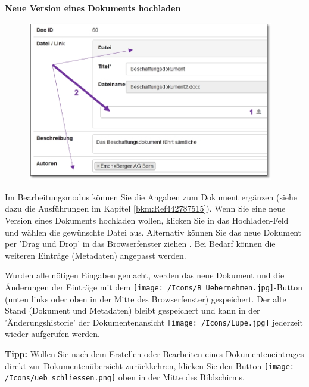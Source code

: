 \pagebreak

\textbf{Neue Version eines Dokuments hochladen}

\vspace{\baselineskip}

\begin{figure}
\vspace{-10pt}
\includegraphics[height=70mm]{../chapters/11_Dokumentenablage/pictures/11-2-5_NeuesDokuHochladen.jpg}
\end{figure}
Im Bearbeitungsmodus können Sie die Angaben zum Dokument ergänzen (siehe dazu die Ausführungen im Kapitel \ref{bkm:Ref442787515}). Wenn Sie eine neue Version eines Dokuments hochladen wollen, klicken Sie in das Hochladen-Feld  und wählen die gewünschte Datei aus. Alternativ können Sie das neue Dokument per 'Drag und Drop' in das Browserfenster ziehen . Bei Bedarf können die weiteren Einträge (Metadaten) angepasst werden.

\vspace{\baselineskip}

Wurden alle nötigen Eingaben gemacht, werden das neue Dokument und die Änderungen der Einträge mit dem \texttt{[image: /Icons/B\_Uebernehmen.jpg]}-Button (unten links oder oben in der Mitte des Browserfenster) gespeichert. Der alte Stand (Dokument und Metadaten) bleibt gespeichert und kann in der 'Änderungshistorie' der Dokumentenansicht \texttt{[image: /Icons/Lupe.jpg]} jederzeit wieder aufgerufen werden.

\vspace{\baselineskip}

\textbf{Tipp:} Wollen Sie nach dem Erstellen oder Bearbeiten eines Dokumenteneintrages direkt zur Dokumentenübersicht zurückkehren, klicken Sie den Button \texttt{[image: /Icons/ueb\_schliessen.png]} oben in der Mitte des Bildschirms.

